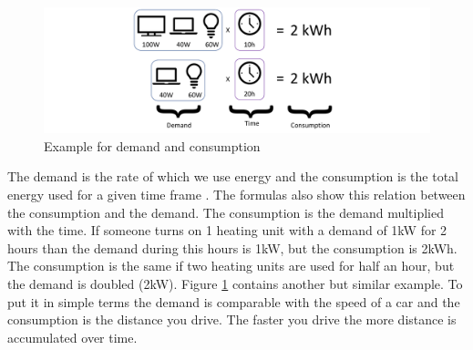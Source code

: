 \begin{figure}[!h]
	\centering
	\includegraphics[width=1.0\textwidth]{../figures/DemandConsumption.pdf}
	\caption{Example for demand and consumption}
	\label{fig:demandConsumption}
\end{figure}

The demand is the rate of which we use energy and the consumption is the total energy used for a given time frame \cite{StonyBrookUniversity}. The formulas also show this relation between the consumption and the demand. The consumption is the demand multiplied with the time. If someone turns on 1 heating unit with a demand of 1kW for 2 hours than the demand during this hours is 1kW, but the consumption is 2kWh. The consumption is the same if two heating units are used for half an hour, but the demand is doubled (2kW). Figure \ref{fig:demandConsumption} contains another but similar example. To put it in simple terms the demand is comparable with the speed of a car and the consumption is the distance you drive. The faster you drive the more distance is accumulated over time.